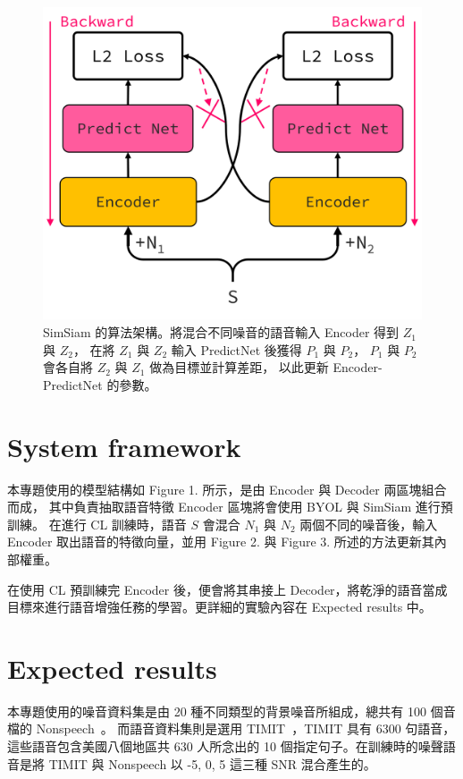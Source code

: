 \documentclass[10pt,twocolumn,letterpaper]{article}
\begin{document}
\begin{CJK}{UTF8}{bkai}
   \begin{figure}[t]
      \begin{center}
         \includegraphics[width=0.8\linewidth]{img/SimSiam.png}
      \end{center}
      \caption{
         SimSiam 的算法架構。將混合不同噪音的語音輸入 Encoder 得到 $Z_1$ 與 $Z_2$，
         在將 $Z_1$ 與 $Z_2$ 輸入 PredictNet 後獲得 $P_1$ 與 $P_2$，
         $P_1$ 與 $P_2$ 會各自將 $Z_2$ 與 $Z_1$ 做為目標並計算差距，
         以此更新 Encoder-PredictNet 的參數。
      }
      \label{fig:long}
      \label{fig:onecol}
   \end{figure}
   \section{System framework}
   本專題使用的模型結構如 Figure 1. 所示，是由 Encoder 與 Decoder 兩區塊組合而成，
   其中負責抽取語音特徵 Encoder 區塊將會使用 BYOL 與 SimSiam 進行預訓練。
   在進行 CL 訓練時，語音 $S$ 會混合 $N_1$ 與 $N_2$ 兩個不同的噪音後，輸入 Encoder
   取出語音的特徵向量，並用 Figure 2. 與 Figure 3. 所述的方法更新其內部權重。

   在使用 CL 預訓練完 Encoder 後，便會將其串接上
   Decoder，將乾淨的語音當成目標來進行語音增強任務的學習。更詳細的實驗內容在 Expected results 中。


   \section{Expected results}
   本專題使用的噪音資料集是由 20 種不同類型的背景噪音所組成，總共有 100 個音檔的 Nonspeech~\cite{Nonspeech}。
   而語音資料集則是選用 TIMIT~\cite{timit}，TIMIT 具有 6300 句語音，這些語音包含美國八個地區共 630 人所念出的 10
   個指定句子。在訓練時的噪聲語音是將 TIMIT 與 Nonspeech 以 -5, 0, 5 這三種 SNR 混合產生的。



\end{CJK}
\end{document}
